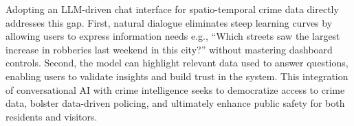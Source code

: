 
Adopting an LLM-driven chat interface for spatio-temporal crime data directly addresses this gap. First, natural dialogue eliminates steep learning curves by allowing users to express information needs e.g., ``Which streets saw the largest increase in robberies last weekend in this city?'' without mastering dashboard controls. Second, the model can highlight relevant data used to answer questions, enabling users to validate insights and build trust in the system. This integration of conversational AI with crime intelligence seeks to democratize access to crime data, bolster data-driven policing, and ultimately enhance public safety for both residents and visitors.







